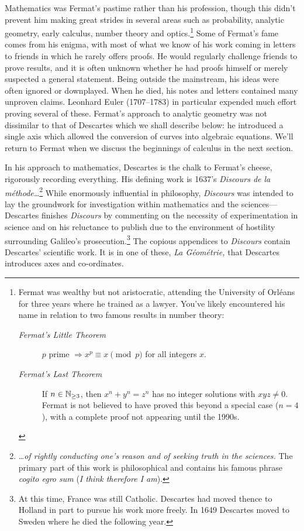  Mathematics was Fermat's pastime rather than his profession, though this didn't prevent him making great strides in several areas such as probability, analytic geometry, early calculus, number theory and optics.\footnote{%
	Fermat was wealthy but not aristocratic, attending the University of Orléans for three years where he trained as a lawyer. You've likely encountered his name in relation to two famous results in number theory: 
	\begin{description}
		\item[\normalfont\emph{Fermat's Little Theorem}] $p$ prime $\Longrightarrow x^p\equiv x\pmod p$ for all integers $x$.
		\item[\normalfont\emph{Fermat's Last Theorem}] If $n\in\mathbb{N}_{\ge 3}$, then $x^n+y^n=z^n$ has no integer solutions with $xy z\neq 0$. Fermat is not believed to have proved this beyond a special case ($n=4$), with a complete proof not appearing until the 1990s. 
	\end{description}
} Some of Fermat's fame comes from his enigma, with most of what we know of his work coming in letters to friends in which he rarely offers proofs. He would regularly challenge friends to prove results, and it is often unknown whether he had proofs himself or merely suspected a general statement. Being outside the mainstream, his ideas were often ignored or downplayed. When he died, his notes and letters contained many unproven claims. Leonhard Euler (1707--1783) in particular expended much effort proving several of these.\smallbreak
Fermat's approach to analytic geometry was not dissimilar to that of Descartes which we shall describe below: he introduced a single axis which allowed the conversion of curves into algebraic equations. We'll return to Fermat when we discuss the beginnings of calculus in the next section.


 In his approach to mathematics, Descartes is the chalk to Fermat's cheese, rigorously recording everything. His defining work is 1637's \emph{Discours de la méthode\ldots}\footnote{\ldots \emph{of rightly conducting one's reason and of seeking truth in the sciences.} The primary part of this work is philosophical and contains his famous phrase \emph{cogito egro sum} (\emph{I think therefore I am}).} While enormously influential in philosophy, \emph{Discours} was intended to lay the groundwork for investigation within mathematics and the sciences---Descartes finishes \emph{Discours} by commenting on the necessity of experimentation in science and on his reluctance to publish due to the environment of hostility surrounding Galileo's prosecution.\footnote{At this time, France was still Catholic. Descartes had moved thence to Holland in part to pursue his work more freely. In 1649 Descartes moved to Sweden where he died the following year.} The copious appendices to \emph{Discours} contain Descartes' scientific work. It is in one of these, \emph{La Géométrie,} that Descartes introduces axes and co-ordinates.
\par


